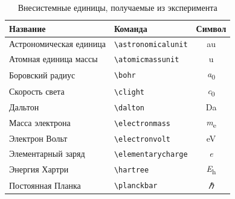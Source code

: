 \begin{table}
    \centering
    \captionsetup{justification=centering}
    \caption{Внесистемные единицы, получаемые из эксперимента}\label{tab:unit:physical}
    \begin{tabular}{llc}
        \toprule
        Название                & Команда                  & Символ                 \\
        \midrule
        Астрономическая единица & \verb|\astronomicalunit| & \si{\astronomicalunit} \\
        Атомная единица массы   & \verb|\atomicmassunit|   & \si{\atomicmassunit}   \\
        Боровский радиус        & \verb|\bohr|             & \si{\bohr}             \\
        Скорость света          & \verb|\clight|           & \si{\clight}           \\
        Дальтон                 & \verb|\dalton|           & \si{\dalton}           \\
        Масса электрона         & \verb|\electronmass|     & \si{\electronmass}     \\
        Электрон Вольт          & \verb|\electronvolt|     & \si{\electronvolt}     \\
        Элементарный заряд      & \verb|\elementarycharge| & \si{\elementarycharge} \\
        Энергия Хартри          & \verb|\hartree|          & \si{\hartree}          \\
        Постоянная Планка       & \verb|\planckbar|        & \si{\planckbar}        \\
        \bottomrule
    \end{tabular}
\end{table}

